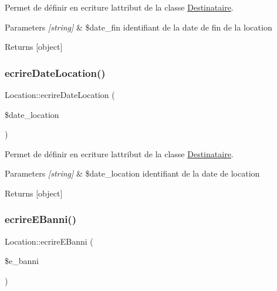 Permet de définir en ecriture l\textquotesingle{}attribut de la classe \hyperlink{class_destinataire}{Destinataire}. 


\begin{DoxyParams}{Parameters}
{\em \mbox{[}string\mbox{]}} & \$date\+\_\+fin identifiant de la date de fin de la location \\
\hline
\end{DoxyParams}
\begin{DoxyReturn}{Returns}
\mbox{[}object\mbox{]} 
\end{DoxyReturn}
\mbox{\label{class_location_a6f5f309c7c5620fe23f6ebd74c244a88}} 
\subsubsection{\texorpdfstring{ecrire\+Date\+Location()}{ecrireDateLocation()}}
{\footnotesize\ttfamily Location\+::ecrire\+Date\+Location (\begin{DoxyParamCaption}\item[{}]{\$date\+\_\+location }\end{DoxyParamCaption})}



Permet de définir en ecriture l\textquotesingle{}attribut de la classe \hyperlink{class_destinataire}{Destinataire}. 


\begin{DoxyParams}{Parameters}
{\em \mbox{[}string\mbox{]}} & \$date\+\_\+location identifiant de la date de location \\
\hline
\end{DoxyParams}
\begin{DoxyReturn}{Returns}
\mbox{[}object\mbox{]} 
\end{DoxyReturn}
\mbox{\label{class_location_a7dc2086d6b996c3a184515bf9fd338a4}} 
\subsubsection{\texorpdfstring{ecrire\+E\+Banni()}{ecrireEBanni()}}
{\footnotesize\ttfamily Location\+::ecrire\+E\+Banni (\begin{DoxyParamCaption}\item[{}]{\$e\+\_\+banni }\end{DoxyParamCaption})}



